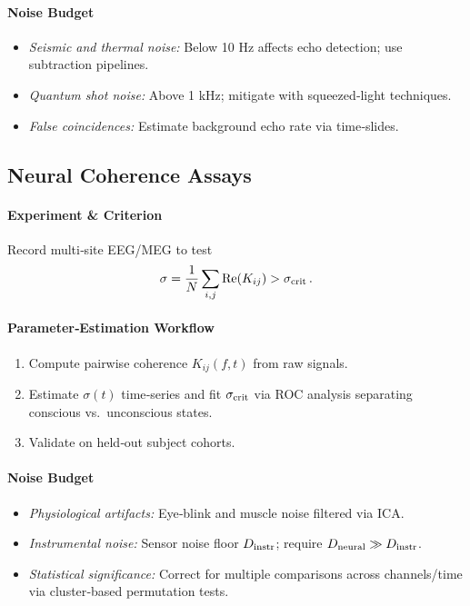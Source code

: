 \paragraph{Noise Budget}
\begin{itemize}
  \item \emph{Seismic and thermal noise:} Below 10 Hz affects echo detection; use subtraction pipelines.  
  \item \emph{Quantum shot noise:} Above 1 kHz; mitigate with squeezed‐light techniques.  
  \item \emph{False coincidences:} Estimate background echo rate via time‐slides.
\end{itemize}

\subsection{Neural Coherence Assays}
\paragraph{Experiment \& Criterion}
Record multi‐site EEG/MEG to test  
\[
\sigma = \frac{1}{N}\sum_{i,j}\Re(K_{ij}) > \sigma_{\rm crit}\,.
\]
\paragraph{Parameter‐Estimation Workflow}
\begin{enumerate}
  \item Compute pairwise coherence $K_{ij}(f,t)$ from raw signals.  
  \item Estimate $\sigma(t)$ time‐series and fit $\sigma_{\rm crit}$ via ROC analysis separating conscious vs.\ unconscious states.  
  \item Validate on held‐out subject cohorts.
\end{enumerate}
\paragraph{Noise Budget}
\begin{itemize}
  \item \emph{Physiological artifacts:} Eye‐blink and muscle noise filtered via ICA.  
  \item \emph{Instrumental noise:} Sensor noise floor $D_{\rm instr}$; require $D_{\rm neural}\gg D_{\rm instr}$.  
  \item \emph{Statistical significance:} Correct for multiple comparisons across channels/time via cluster‐based permutation tests.
\end{itemize}

